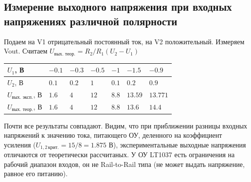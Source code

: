\documentclass[a4paper, 12pt]{article}
\begin{document}
    \subsection{Измерение выходного напряжения при входных напряжениях различной полярности}
    Подаем на V1 отрицательный постоянный ток, на V2 положительный. Измеряем Vout. Считаем
    $U_{\text{вых. теор.}}=R_2/R_1\left( U_2-U_1 \right)$
    \begin{center}
        \begin{tabular}{ | m{6em} | m{4em}| m{4em} | m{4em} | m{4em} | m{4em} | m{4em} | } 
        \hline
        $U_1$, В& $-0.1$ &$-0.3$ &$-0.5$ &$-1$& $-1.5$ & $-0.9$\\ 
        \hline
        $U_2$, В& $0.1$ &$0.2$ &$1$ &$0.1$& $0.2$ & $0.9$\\ 
        \hline
        $U_{\text{вых. эксп.}}$, В& $1.6$ &$4$ &$12$ &$8.8$& $13.59$ & $13.771$\\
        \hline
        $U_{\text{вых. теор.}}$, В& $1.6$ &$4$ &$12$ &$8.8$& $13.6$ & $14.4$\\
        \hline
        \end{tabular}
    \end{center}
    Почти все результаты совпадают. Видим, что при приближении разницы входных напряжений к значению
    тока, питающего ОУ, деленного на коэффициент усиления ($U_{1,2\,\text{крит.}}=15/8=1.875$ В),
    экспериментальные выходные напряжения отличаются от
    теоретически рассчитаных. У ОУ LT1037 есть ограничения на рабочий диапазон входов,
    он не Rail-to-Rail типа (не может выдать напряжение, равное его питанию).
\end{document}
